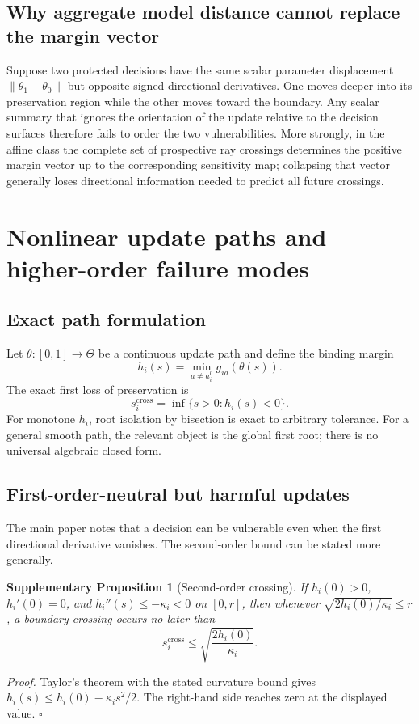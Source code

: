 \documentclass[11pt,letterpaper]{article}
\theoremstyle{plain}
\newtheorem{proposition}{Supplementary Proposition}
\newcommand{\1}{\mathbf 1}
\begin{document}
\subsection{Why aggregate model distance cannot replace the margin vector}
Suppose two protected decisions have the same scalar parameter displacement $\|\theta_1-\theta_0\|$ but opposite signed directional derivatives. One moves deeper into its preservation region while the other moves toward the boundary. Any scalar summary that ignores the orientation of the update relative to the decision surfaces therefore fails to order the two vulnerabilities. More strongly, in the affine class the complete set of prospective ray crossings determines the positive margin vector up to the corresponding sensitivity map; collapsing that vector generally loses directional information needed to predict all future crossings.

\section{Nonlinear update paths and higher-order failure modes}
\subsection{Exact path formulation}
Let $\theta:[0,1]\rightarrow\Theta$ be a continuous update path and define the binding margin
\begin{equation}
 h_i(s)=\min_{a\neq a_i^0} g_{ia}(\theta(s)).
\label{eq:s_binding_margin}
\end{equation}
The exact first loss of preservation is
\begin{equation}
 s_i^{\mathrm{cross}}=\inf\{s>0:h_i(s)<0\}.
\label{eq:s_general_cross}
\end{equation}
For monotone $h_i$, root isolation by bisection is exact to arbitrary tolerance. For a general smooth path, the relevant object is the global first root; there is no universal algebraic closed form.

\subsection{First-order-neutral but harmful updates}
The main paper notes that a decision can be vulnerable even when the first directional derivative vanishes. The second-order bound can be stated more generally.
\begin{proposition}[Second-order crossing]
If $h_i(0)>0$, $h_i'(0)=0$, and $h_i''(s)\le-\kappa_i<0$ on $[0,r]$, then whenever $\sqrt{2h_i(0)/\kappa_i}\le r$, a boundary crossing occurs no later than
\begin{equation}
 s_i^{\mathrm{cross}}\le\sqrt{\frac{2h_i(0)}{\kappa_i}}.
\label{eq:s_second_cross}
\end{equation}
\end{proposition}
\textit{Proof.} Taylor's theorem with the stated curvature bound gives $h_i(s)\le h_i(0)-\kappa_i s^2/2$. The right-hand side reaches zero at the displayed value. $\square$
\end{document}
